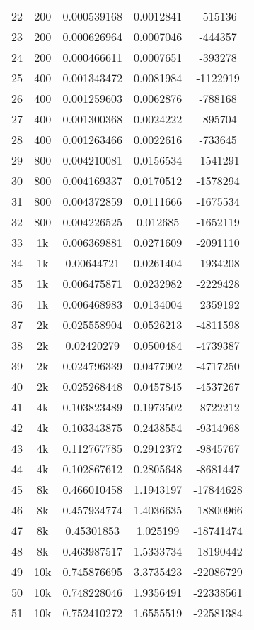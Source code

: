 \begin{center}
\begin{longtable}{|c|c|c|c|c|}
22 & 200 & 0.000539168 & 0.0012841 & -515136\\
23 & 200 & 0.000626964 & 0.0007046 & -444357\\
24 & 200 & 0.000466611 & 0.0007651 & -393278\\
\hline
25 & 400 & 0.001343472 & 0.0081984 & -1122919\\
26 & 400 & 0.001259603 & 0.0062876 & -788168\\
27 & 400 & 0.001300368 & 0.0024222 & -895704\\
28 & 400 & 0.001263466 & 0.0022616 & -733645\\
\hline
29 & 800 & 0.004210081 & 0.0156534 & -1541291\\
30 & 800 & 0.004169337 & 0.0170512 & -1578294\\
31 & 800 & 0.004372859 & 0.0111666 & -1675534\\
32 & 800 & 0.004226525 & 0.012685 & -1652119\\
\hline
33 & 1k & 0.006369881 & 0.0271609 & -2091110\\
34 & 1k & 0.00644721 & 0.0261404 & -1934208\\
35 & 1k & 0.006475871 & 0.0232982 & -2229428\\
36 & 1k & 0.006468983 & 0.0134004 & -2359192\\
\hline
37 & 2k & 0.025558904 & 0.0526213 & -4811598\\
38 & 2k & 0.02420279 & 0.0500484 & -4739387\\
39 & 2k & 0.024796339 & 0.0477902 & -4717250\\
40 & 2k & 0.025268448 & 0.0457845 & -4537267\\
\hline
41 & 4k & 0.103823489 & 0.1973502 & -8722212\\
42 & 4k & 0.103343875 & 0.2438554 & -9314968\\
43 & 4k & 0.112767785 & 0.2912372 & -9845767\\
44 & 4k & 0.102867612 & 0.2805648 & -8681447\\
\hline
45 & 8k & 0.466010458 & 1.1943197 & -17844628\\
46 & 8k & 0.457934774 & 1.4036635 & -18800966\\
47 & 8k & 0.45301853 & 1.025199 & -18741474\\
48 & 8k & 0.463987517 & 1.5333734 & -18190442\\
\hline
49 & 10k & 0.745876695 & 3.3735423 & -22086729\\
50 & 10k & 0.748228046 & 1.9356491 & -22338561\\
51 & 10k & 0.752410272 & 1.6555519 & -22581384\\

\end{longtable}
\end{center}
